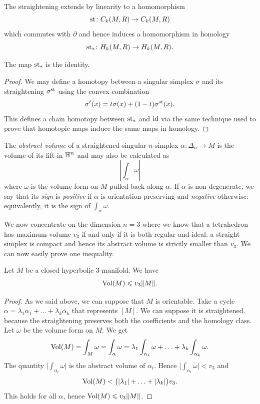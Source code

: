 The straightening extends by linearity to a homomorphism
$${\rm st}\colon C_k(M,R) \to C_k(M,R)$$
which commutes with $\partial$ and hence induces a homomorphism in homology
$${\rm st}_*\colon H_k(M,R) \to H_k(M,R).$$
\begin{prop} The map ${\rm st}_*$ is the identity.
\end{prop}
\begin{proof}
We may define a homotopy between a singular simplex $\sigma$ and its straightening $\sigma^{\rm st}$ using the convex combination
$$\sigma^t(x) =t\sigma(x) + (1-t)\sigma^{\rm st}(x).$$
This defines a chain homotopy between ${\rm st}_*$ and ${\rm id}$ via the same technique used to prove that homotopic maps induce the same maps in homology.
\end{proof}

The \emph{abstract volume} of a straightened singular $n$-simplex $\alpha\colon\Delta_n \to M$ is the volume of its lift in $\mathbb{H}^n$ and may also be calculated as
$$\left|\int_\alpha \omega\right|$$
where $\omega$ is the volume form on $M$ pulled back along $\alpha$. 
If $\alpha$ is non-degenerate, we say that its \emph{sign} is \emph{positive} if $\alpha$ is orientation-preserving and \emph{negative} otherwise: equivalently, it is the sign of $\int_\alpha\omega$.

We now concentrate on the dimension $n=3$ where we know that a tetrahedron has maximum volume $v_3$ if and only if it is both regular and ideal: a straight simplex is compact and hence its abstract volume is strictly smaller than $v_3$. 
We can now easily prove one inequality. 

\begin{prop} \label{Gromov:1:prop}
Let $M$ be a closed hyperbolic $3$-manifold. We have
$${\rm Vol}(M) \leqslant v_3 \|M\|.$$
\end{prop}
\begin{proof}
As we said above, we can suppose that $M$ is orientable. Take a cycle $\alpha = \lambda_1\alpha_1+\ldots+\lambda_k\alpha_k$ that represents $[M]$. We can suppose it is straightened, because the straightening preserves both the coefficients and the homology class. Let $\omega$ be the volume form on $M$. We get 
$${\rm Vol} (M) = \int_M \omega = \int_\alpha \omega = \lambda_1 \int_{\alpha_1}\omega + \ldots + \lambda_k \int_{\alpha_k}\omega.$$
The quantity $\big|\int_{\alpha_i}\omega\big|$ is the abstract volume of $\alpha_i$. Hence $\big|\int_{\alpha_i}\omega\big|<v_3$ and
$${\rm Vol}(M) < \big(|\lambda_1|+ \ldots +|\lambda_k|\big)v_3.$$
This holds for all $\alpha$, hence ${\rm Vol}(M) \leqslant v_3 \|M\|$.
\end{proof}

